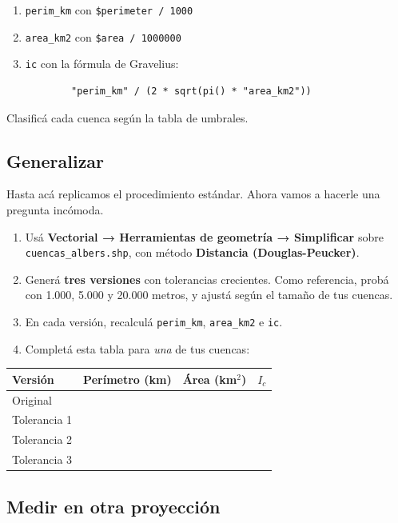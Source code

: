 \documentclass{article}
\begin{document}
\begin{enumerate}
    \item \texttt{perim\_km} con \texttt{\$perimeter / 1000}
    \item \texttt{area\_km2} con \texttt{\$area / 1000000}
    \item \texttt{ic} con la fórmula de Gravelius:
    \begin{verbatim}
        "perim_km" / (2 * sqrt(pi() * "area_km2"))
    \end{verbatim}
\end{enumerate}

Clasificá cada cuenca según la tabla de umbrales.

\subsection{Generalizar}

Hasta acá replicamos el procedimiento estándar. Ahora vamos a hacerle una pregunta incómoda.

\begin{enumerate}
    \item Usá \textbf{Vectorial → Herramientas de geometría → Simplificar} sobre \texttt{cuencas\_albers.shp}, con método \textbf{Distancia (Douglas-Peucker)}.
    \item Generá \textbf{tres versiones} con tolerancias crecientes. Como referencia, probá con 1.000, 5.000 y 20.000 metros, y ajustá según el tamaño de tus cuencas.
    \item En cada versión, recalculá \texttt{perim\_km}, \texttt{area\_km2} e \texttt{ic}.
    \item Completá esta tabla para \emph{una} de tus cuencas:
\end{enumerate}

\begin{center}
\begin{tabular}{lccc}
    \toprule
    Versión & Perímetro (km) & Área (km$^2$) & $I_c$ \\
    \midrule
    Original & & & \\
    Tolerancia 1 & & & \\
    Tolerancia 2 & & & \\
    Tolerancia 3 & & & \\
    \bottomrule
\end{tabular}
\end{center}

\subsection{Medir en otra proyección}
\end{document}
